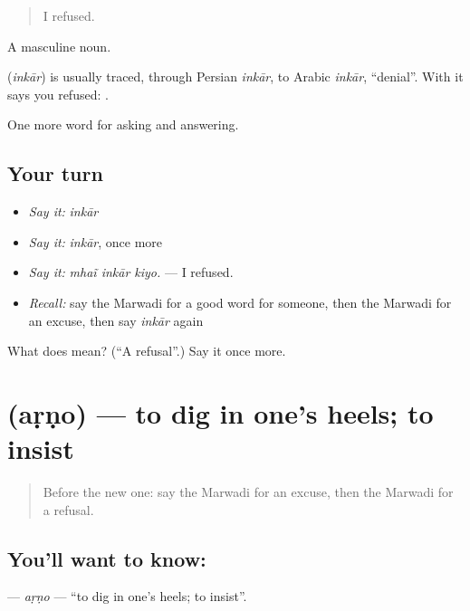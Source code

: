 \begin{quote}
I refused.
\end{quote}

A masculine noun.

\begin{cousinweb}
\textbf{} (\emph{inkār}) is usually traced, through Persian \emph{inkār}, to Arabic \emph{inkār}, \textquotedblleft{}denial\textquotedblright{}. With \textbf{} it says you refused: \textbf{  }.
\end{cousinweb}

\begin{grammarlens}[title={What you've built}]
One more word for asking and answering.
\end{grammarlens}

\subsection*{Your turn}
\begin{itemize}
\raggedright
  \item \emph{Say it:} \emph{inkār}
  \item \emph{Say it:} \emph{inkār}, once more
  \item \emph{Say it:} \emph{mhaĩ inkār kiyo.} — I refused.
  \item \emph{Recall:} say the Marwadi for a good word for someone, then the Marwadi for an excuse, then say \emph{inkār} again
\end{itemize}

\begin{tcolorbox}[breakable,colback=teal!4,colframe=teal!35!black,title={Before you move on}]
What does  mean? (\textquotedblleft{}A refusal\textquotedblright{}.) Say it once more.
\end{tcolorbox}
\section[\texorpdfstring{\mw{अड़णो} (aṛṇo)}{अड़णो (aṛṇo)}]{ (aṛṇo) — to dig in one's heels; to insist}

\label{lesson:MW-C269-arno}



\begin{quote}
Before the new one: say the Marwadi for an excuse, then the Marwadi for a refusal.
\end{quote}

\subsection*{You'll want to know: }
\textbf{} — \emph{aṛṇo} — \textquotedblleft{}to dig in one's heels; to insist\textquotedblright{}.

